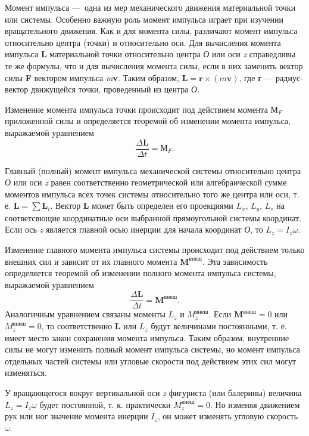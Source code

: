 \documentclass[14pt,a4paper,oneside]{extarticle}	%
\begin{document}
	Момент импульса — одна из мер механического движения материальной точки или системы.
	Особенно важную роль момент импульса играет при изучении вращательного движения.
	Как и для момента силы, различают момент импульса относительно центра (точки) и относительно оси. 
	Для вычисления момента импульса \textbf{L} материальной точки относительно центра \textit{О} или оси \textit{z} справедливы те же формулы, что и для вычисления момента силы, если в них заменить вектор силы \textbf{F} вектором импульса \textit{m}\textbf{v}.
	Таким образом, $\textbf{L} = \textbf{r}\times (m\textbf{v})$, где \textbf{r} — радиус-вектор движущейся точки, проведенный из центра \textit{О}.
	
	Изменение момента импульса точки происходит под действием момента $ \textbf{М}_F $ приложенной силы и определяется теоремой об изменении момента импульса, выражаемой уравнением
	$$ \frac{\Delta \textbf{L}}{\Delta t}  = \textbf{М}_F.$$
	
	Главный (полный) момент импульса механической системы относительно центра \textit{О} или оси \textit{z} равен соответственно геометрической или алгебраической сумме моментов импульса всех точек системы относительно того же центра или оси, т. е. $ \textbf{L} = \sum \textbf{L}_i $. 
	Вектор \textbf{L} может быть определен его проекциями $ L_x $, $ L_y $, $ L_z $ на соответсвющие координатные оси выбранной прямоугольной системы координат.
	Если ось \textit{z} является главной осью инерции для начала координат \textit{О}, то $ L_z = I_z\omega $.
	
	Изменение главного момента импульса системы происходит под действием только внешних сил и зависит от их главного момента $ \textbf{M}^\text{внеш} $.
	Эта зависимость определяется теоремой об изменении полного момента импульса системы, выражаемой уравнением $$ \frac{\Delta \textbf{L}}{\Delta t} = \textbf{M}^\text{внеш}.$$
	Аналогичным уравнением связаны моменты $ L_z $ и $ M_z^\text{внеш} $.
	Если $ \textbf{M}^\text{внеш}=0 $ или $ M_z^\text{внеш}=0 $, то соответственно \textbf{L} или $ L_z $ будут величинами постоянными, т. е. имеет место закон сохранения момента импульса.
	Таким образом, внутренние силы не могут изменить полный момент импульса системы, но момент импульса отдельных частей системы или угловые скорости под действием этих сил могут изменяться.
	
У вращающегося вокруг вертикальной оси \textit{z} фигуриста (или балерины) величина $ L_z = I_z\omega $ будет постоянной, т. к. практически $ M_z^\text{внеш}=0 $.
	Но изменяя движением рук или ног значение момента инерции $ I_z $, он может изменять угловую скорость $ \omega $.
	
\end{document}
